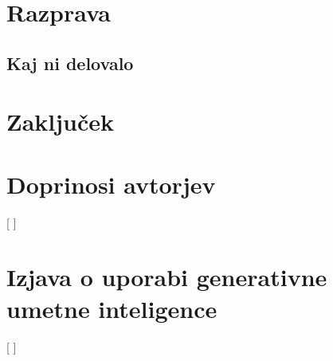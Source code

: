 \section{Razprava}
\label{g02:sec:razprava}

\subsection{Kaj ni delovalo}
\label{g02:sec:neuspehi}

\section{Zaključek}
\label{g02:sec:zakljucek}

\section*{Doprinosi avtorjev}

[ ]

\section*{Izjava o uporabi generativne umetne inteligence}

[ ]
